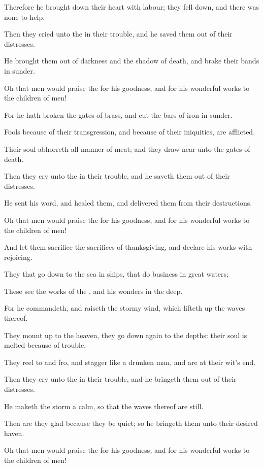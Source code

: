 \verse Therefore he brought down their heart with labour; they fell down, and there was none to help.

\verse Then they cried unto the \LORD in their trouble, and he saved them out of their distresses.

\verse He brought them out of darkness and the shadow of death, and brake their bands in sunder.

\verse Oh that men would praise the \LORD for his goodness, and for his wonderful works to the children of men!

\verse For he hath broken the gates of brass, and cut the bars of iron in sunder.

\verse Fools because of their transgression, and because of their iniquities, are afflicted.

\verse Their soul abhorreth all manner of meat; and they draw near unto the gates of death.

\verse Then they cry unto the \LORD in their trouble, and he saveth them out of their distresses.

\verse He sent his word, and healed them, and delivered them from their destructions.

\verse Oh that men would praise the \LORD for his goodness, and for his wonderful works to the children of men!

\verse And let them sacrifice the sacrifices of thanksgiving, and declare his works with rejoicing.

\verse They that go down to the sea in ships, that do business in great waters;

\verse These see the works of the \LORD, and his wonders in the deep.

\verse For he commandeth, and raiseth the stormy wind, which lifteth up the waves thereof.

\verse They mount up to the heaven, they go down again to the depths: their soul is melted because of trouble.

\verse They reel to and fro, and stagger like a drunken man, and are at their wit's end.

\verse Then they cry unto the \LORD in their trouble, and he bringeth them out of their distresses.

\verse He maketh the storm a calm, so that the waves thereof are still.

\verse Then are they glad because they be quiet; so he bringeth them unto their desired haven.

\verse Oh that men would praise the \LORD for his goodness, and for his wonderful works to the children of men!

